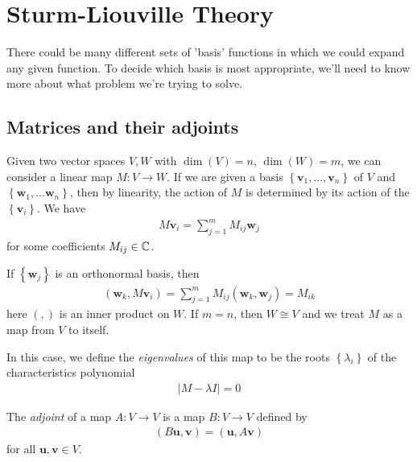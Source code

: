 \documentclass[a4paper]{article}
\begin{document}
\newpage

\section{Sturm-Liouville Theory}

There could be many different sets of 'basis' functions in which we could expand any given function. To decide which basis is most appropriate, we'll need to know more about what problem we're trying to solve.

\subsection{Matrices and their adjoints}

Given two vector spaces $V,W$ with $\dim\left(V\right) = n$, $\dim \left(W\right) = m$, we can consider a linear map $M: V\to W$. If we are given a basis $\left\{\mathbf{v}_1,...,\mathbf{v}_n\right\}$ of $V$ and $\left\{\mathbf{w}_1,...\mathbf{w}_n\right\}$, then by linearity, the action of $M$ is determined by its action of the $\left\{\mathbf{v}_i\right\}$. We have
\begin{equation*}
\begin{aligned}
M \mathbf{v}_i = \sum_{j=1}^m M_{ij} \mathbf{w}_j
\end{aligned}
\end{equation*}
for some coefficients $M_{ij} \in \mathbb{C}$.

If $\left\{\mathbf{w}_j\right\}$ is an orthonormal basis, then 
\begin{equation*}
\begin{aligned}
\left(\mathbf{w}_k,M \mathbf{v}_i\right) = \sum_{j=1}^m M_{ij} \left(\mathbf{w}_k,\mathbf{w}_j\right) = M_{ik}
\end{aligned}
\end{equation*}
here $\left(,\right)$ is an inner product on $W$. If $m=n$, then $W \cong V$ and we treat $M$ as a map from $V$ to itself.

In this case, we define the \emph{eigenvalues} of this map to be the roots $\left\{\lambda_i\right\}$ of the characteristics polynomial
\begin{equation*}
\begin{aligned}
|M-\lambda I| = 0
\end{aligned}
\end{equation*}

The \emph{adjoint} of a map $A:V \to V$ is a map $B:V\to V$ defined by
\begin{equation*}
\begin{aligned}
\left(B\mathbf{u},\mathbf{v}\right) = \left(\mathbf{u},A\mathbf{v}\right)
\end{aligned}
\end{equation*}
for all $\mathbf{u},\mathbf{v} \in V$.
\end{document}

